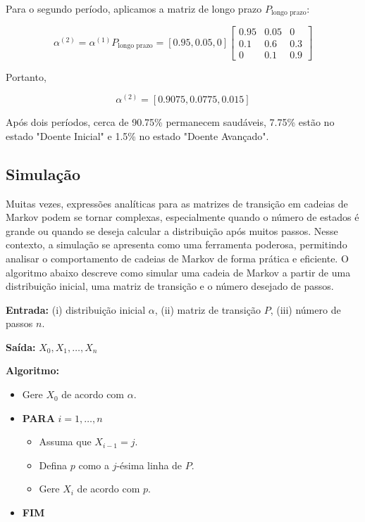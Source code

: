\documentclass[12pt]{article}
\theoremstyle{break}
\begin{document}
Para o segundo período, aplicamos a matriz de longo prazo \( P_{\text{longo prazo}} \):

\[
\alpha^{(2)} = \alpha^{(1)} P_{\text{longo prazo}} = [0.95, 0.05, 0] \begin{bmatrix} 0.95 & 0.05 & 0 \\ 0.1 & 0.6 & 0.3 \\ 0 & 0.1 & 0.9 \end{bmatrix}
\]


Portanto,

\[
\alpha^{(2)} = [0.9075, 0.0775, 0.015]
\]

Após dois períodos, cerca de 90.75\% permanecem saudáveis, 7.75\% estão no estado "Doente Inicial" e 1.5\% no estado "Doente Avançado".



\subsection{Simulação}

Muitas vezes, expressões analíticas para as matrizes de transição em cadeias de Markov podem se tornar complexas, especialmente quando o número de estados é grande ou quando se deseja calcular a distribuição após muitos passos. Nesse contexto, a simulação se apresenta como uma ferramenta poderosa, permitindo analisar o comportamento de cadeias de Markov de forma prática e eficiente. O algoritmo abaixo descreve como simular uma cadeia de Markov a partir de uma distribuição inicial, uma matriz de transição e o número desejado de passos.

\textbf{Entrada:} (i) distribuição inicial \( \alpha \), (ii) matriz de transição \( P \), (iii) número de passos \( n \).

\textbf{Saída:} \( X_0, X_1, \dots, X_n \)

\textbf{Algoritmo:}
\begin{itemize}
    \item Gere \( X_0 \) de acordo com \( \alpha \).
    \item \textbf{PARA} \( i = 1, \dots, n \)
    \begin{itemize}
        \item Assuma que \( X_{i-1} = j \).
        \item Defina \( p \) como a \( j \)-ésima linha de \( P \).
        \item Gere \( X_i \) de acordo com \( p \).
    \end{itemize}
    \item \textbf{FIM}
\end{itemize}
\end{document}
